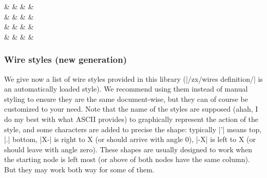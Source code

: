 \documentclass[a4paper,doc2]{ltxdoc} %
\begin{document}
{\begin{codeexample}[width=0pt]
{
  \def\zxDebugMode{}%
  \begin{ZX}[zx row sep=1pt,
    execute at begin picture={%
      \def\Zpifour{\zxFracZ[a=Zpi4]-{\pi}{4}}%
      \def\mypitwo{\zxFracX[a=mypi2]{\pi}{2}}%
    }
    ]
    & \zxN[a=n]{}  & \zxZ[a=xmiddle]{}       &            & \zxN[a=out1]{} \\
    \zxN[a=in1]{} & \Zpifour{}   & \zxX[a=Xdown]{}         & \mypitwo{} &                \\
    &              &                         &            & \zxN[a=out2]{} \\
    \zxN[a=in2]{} & \zxX[a=X1]{} & \zxZ[a=toprightpi]{\pi} &            & \zxN[a=out3]{}
    \ar[from=in1,to=X1,s]
    \ar[from=in2,to=Zpi4,.>]
    \ar[from=X1,to=xmiddle,N']
    \ar[from=X1,to=toprightpi,H]
    \ar[from=Zpi4,to=n,C] \ar[from=n,to=xmiddle,wc]
    \ar[from=Zpi4,to=Xdown]
    \ar[from=xmiddle,to=Xdown,C-]
    \ar[from=xmiddle,to=mypi2,)]
    \ar[from=mypi2,to=toprightpi,(']
    \ar[from=mypi2,to=out1,<']
    \ar[from=mypi2,to=out2,<.]
    \ar[from=Xdown,to=out3,<.]
  \end{ZX}
}
\end{codeexample}

\subsubsection{Wire styles (new generation)}

We give now a list of wire styles provided in this library (|/zx/wires definition/| is an automatically loaded style). We recommend using them instead of manual styling to ensure they are the same document-wise, but they can of course be customized to your need. Note that the name of the styles are supposed (ahah, I do my best with what ASCII provides) to graphically represent the action of the style, and some characters are added to precise the shape: typically |'| means top, |.| bottom, |X-| is right to X (or should arrive with angle 0), |-X| is left to X (or should leave with angle zero). These shapes are usually designed to work when the starting node is left most (or above of both nodes have the same column). But they may work both way for some of them.

}
\end{document}
